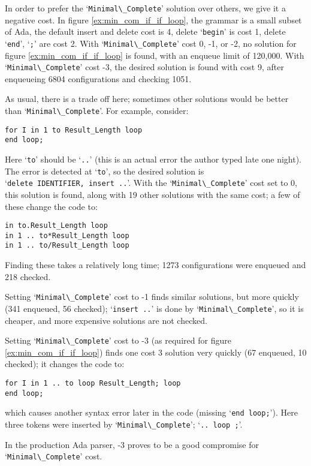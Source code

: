 \documentclass{article}
\newcommand{\code}[1]{`\lstinline|#1|'}
\begin{document}
In order to prefer the \code{Minimal\_Complete} solution over others,
we give it a negative cost. In figure \ref{ex:min_com_if_if_loop}, the
grammar is a small subset of Ada, the
default insert and delete cost is 4, delete \code{begin} is cost 1,
delete \code{end}, \code{;} are cost 2. With \code{Minimal\_Complete}
cost 0, -1, or -2, no solution for figure \ref{ex:min_com_if_if_loop}
is found, with an enqueue limit of 120,000. With
\code{Minimal\_Complete} cost -3, the desired solution is found with
cost 9, after enqueueing 6804 configurations and checking 1051.

As usual, there is a trade off here; sometimes other solutions would
be better than \code{Minimal\_Complete}. For example, consider:
\begin{lstlisting}
for I in 1 to Result_Length loop
end loop;
\end{lstlisting}
Here \code{to} should be \code{..} (this is an actual error the author
typed late one night). The error is detected at \code{to}, so the
desired solution is\\ \code{delete IDENTIFIER, insert ..}. With the
\code{Minimal\_Complete} cost set to 0, this solution is found, along
with 19 other solutions with the same cost; a few of these change the
code to:

\begin{lstlisting}
in to.Result_Length loop
in 1 .. to*Result_Length loop
in 1 .. to/Result_Length loop
\end{lstlisting}

Finding these takes a relatively long time; 1273 configurations
were enqueued and 218 checked.

Setting \code{Minimal\_Complete} cost to -1 finds similar solutions,
but more quickly (341 enqueued, 56 checked); \code{insert ..} is done
by \code{Minimal\_Complete}, so it is cheaper, and more expensive
solutions are not checked.

Setting \code{Minimal\_Complete} cost to -3 (as required for
figure \ref{ex:min_com_if_if_loop}) finds one cost 3 solution very
quickly (67 enqueued, 10 checked); it changes the code to:
\begin{lstlisting}
for I in 1 .. to loop Result_Length; loop
end loop;
\end{lstlisting}
which causes another syntax error later in the code (missing
\code{end loop;}). Here three tokens were inserted by
\code{Minimal\_Complete}; \code{.. loop ;}.

In the production Ada parser, -3 proves to be a good compromise for\\
\code{Minimal\_Complete} cost.
\end{document}
